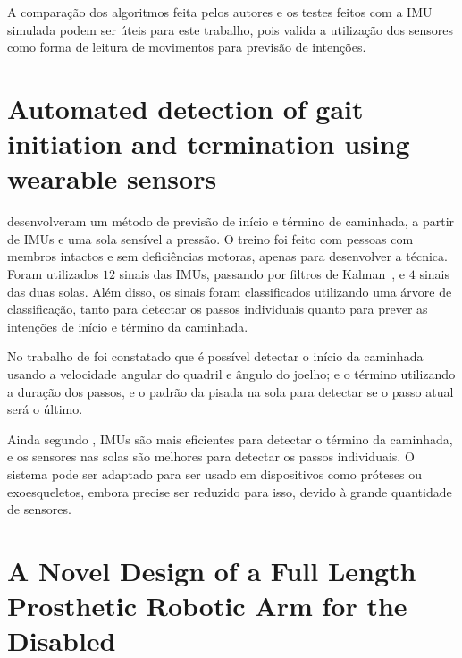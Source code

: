 A comparação dos algoritmos feita pelos autores  e os testes feitos com a IMU simulada podem ser úteis para este trabalho, pois valida a utilização dos sensores como forma de leitura de movimentos para previsão de intenções.


\section[Automated detection of gait initiation and termination using\\wearable sensors]{Automated detection of gait initiation and termination using wearable sensors}\label{sec:rel_novak}

 desenvolveram um método de previsão de início e término de caminhada, a partir de IMUs e uma sola sensível a pressão. O treino foi feito com pessoas com membros intactos e sem deficiências motoras, apenas para desenvolver a técnica. Foram utilizados \(12\) sinais das IMUs, passando por filtros de Kalman~\cite{kalman:1960}, e \(4\) sinais das duas solas. Além disso, os sinais foram classificados utilizando uma árvore de classificação, tanto para detectar os passos individuais quanto para prever as intenções de início e término da caminhada.

No trabalho de  foi constatado que é possível detectar o início da caminhada usando a velocidade angular do quadril e ângulo do joelho; e o término utilizando a duração dos passos, e o padrão da pisada na sola para detectar se o passo atual será o último.

Ainda segundo , IMUs são mais eficientes para detectar o término da caminhada, e os sensores nas solas são melhores para detectar os passos individuais. O sistema pode ser adaptado para ser usado em dispositivos como próteses ou exoesqueletos, embora precise ser reduzido para isso, devido à grande quantidade de sensores.


\section{A Novel Design of a Full Length Prosthetic Robotic Arm for the Disabled}\label{sec:rel_kumar}

